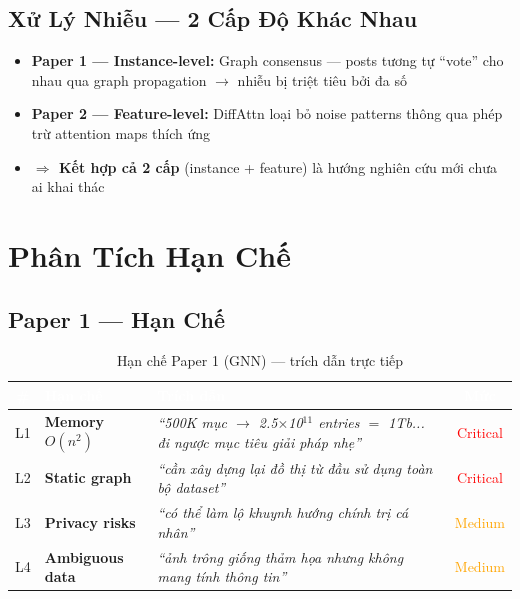 \documentclass[12pt,a4paper]{article}
\begin{document}
\subsection{Xử Lý Nhiễu — 2 Cấp Độ Khác Nhau}

\begin{noveltybox}
\begin{itemize}[leftmargin=*]
  \item \textbf{Paper 1 — Instance-level:} Graph consensus — posts tương tự ``vote'' cho nhau qua graph propagation $\rightarrow$ nhiễu bị triệt tiêu bởi đa số
  \item \textbf{Paper 2 — Feature-level:} DiffAttn loại bỏ noise patterns thông qua phép trừ attention maps thích ứng
  \item \textbf{$\Rightarrow$ Kết hợp cả 2 cấp} (instance + feature) là hướng nghiên cứu mới chưa ai khai thác
\end{itemize}
\end{noveltybox}

\section{Phân Tích Hạn Chế}

\subsection{Paper 1 — Hạn Chế}

\begin{table}[H]
\centering
\caption{Hạn chế Paper 1 (GNN) — trích dẫn trực tiếp}
\begin{tabularx}{\textwidth}{c >{\bfseries}l X c}
\toprule
\rowcolor{tableheader}
\textcolor{white}{\#} & \textcolor{white}{Hạn chế} & \textcolor{white}{Trích dẫn} & \textcolor{white}{Mức} \\
\midrule
L1 & Memory $O(n^2)$ & \textit{``500K mục $\rightarrow$ 2.5$\times$10$^{11}$ entries $=$ 1Tb... đi ngược mục tiêu giải pháp nhẹ''} & \textcolor{red}{Critical} \\
L2 & Static graph & \textit{``cần xây dựng lại đồ thị từ đầu sử dụng toàn bộ dataset''} & \textcolor{red}{Critical} \\
L3 & Privacy risks & \textit{``có thể làm lộ khuynh hướng chính trị cá nhân''} & \textcolor{orange}{Medium} \\
L4 & Ambiguous data & \textit{``ảnh trông giống thảm họa nhưng không mang tính thông tin''} & \textcolor{orange}{Medium} \\
\bottomrule
\end{tabularx}
\end{table}
\end{document}

